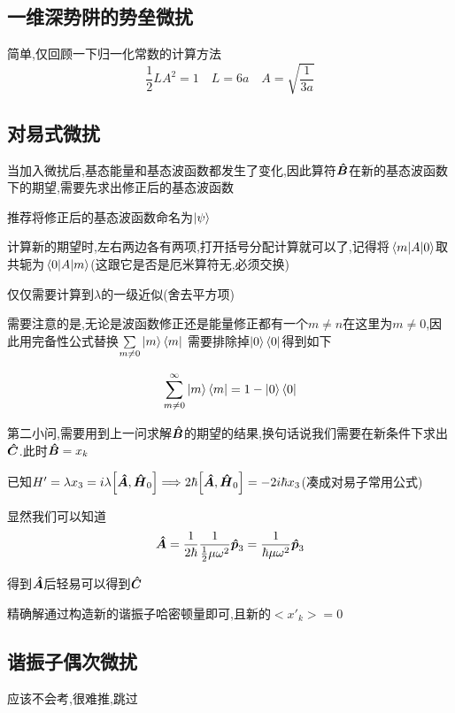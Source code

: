 \documentclass{article}
\begin{document}
        \subsection{一维深势阱的势垒微扰}
            简单,仅回顾一下归一化常数的计算方法
            $$ \frac{1}{2} L A^{2} = 1  \quad L = 6 a \quad A = \sqrt{\frac{1}{3a}} $$
        
        \subsection{对易式微扰}
            当加入微扰后,基态能量和基态波函数都发生了变化,因此算符$\vu*{B}$在新的基态波函数下的期望,需要先求出修正后的基态波函数
            
            推荐将修正后的基态波函数命名为$\ket{\psi}$

            计算新的期望时,左右两边各有两项,打开括号分配计算就可以了,记得将$\mel{m}{A}{0}$取共轭为$\mel{0}{A}{m}$(这跟它是否是厄米算符无,必须交换)
            
            仅仅需要计算到$\lambda$的一级近似(舍去平方项)

            需要注意的是,无论是波函数修正还是能量修正都有一个$m \neq n$在这里为$m \neq 0$,因此用完备性公式替换$\sum\limits_{m\neq0}\ket{m}\bra{m}$
            需要排除掉$\ket{0}\bra{0}$得到如下
            
            $$ \sum\limits_{m\neq0}^{\infty}\ket{m}\bra{m} = 1 - \ket{0} \bra{0} $$

            第二小问,需要用到上一问求解$\vu*{B}$的期望的结果,换句话说我们需要在新条件下求出$\vu*{C}$.此时$\vu*{B} = x_{k}$
            
            已知$ H' = \lambda x_{3} = i \lambda \comm{\vu*{A}}{\vu*{H}_{0}} 
            \lra 2 \hbar \comm{\vu*{A}}{\vu*{H}_{{0}}} = - 2 i \hbar x_{3}$(凑成对易子常用公式)

            显然我们可以知道
            $$ \vu*{A} = \dfrac{1}{2\hbar} \dfrac{1}{\frac{1}{2}\mu \omega^{2} } \vu*{p}_{3} = \dfrac{1}{\hbar \mu \omega^{2}} \vu*{p}_{3} $$

            得到$\vu*{A}$后轻易可以得到$\vu*{C}$

            精确解通过构造新的谐振子哈密顿量即可,且新的$<x'_{k}> = 0$

        \subsection{谐振子偶次微扰}
            应该不会考,很难推,跳过
\end{document}
